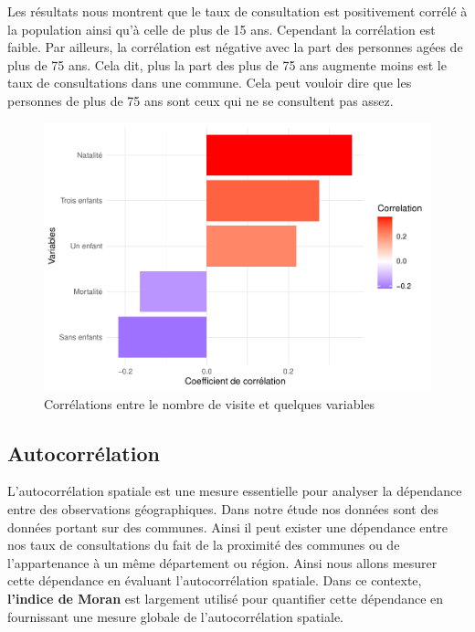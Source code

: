 Les résultats nous montrent que le taux de consultation est positivement
corrélé à la population ainsi qu'à celle de plus de 15 ans. Cependant la
corrélation est faible. Par ailleurs, la corrélation est négative avec
la part des personnes agées de plus de 75 ans. Cela dit, plus la part
des plus de 75 ans augmente moins est le taux de consultations dans une
commune. Cela peut vouloir dire que les personnes de plus de 75 ans sont
ceux qui ne se consultent pas assez.

\begin{figure}

{\centering \includegraphics{4_Analyse_Descriptive_files/figure-latex/unnamed-chunk-12-1} 

}

\caption{Corrélations entre le nombre de visite et quelques variables}\label{fig:unnamed-chunk-12}
\end{figure}

\subsection{Autocorrélation}\label{autocorruxe9lation}

L'autocorrélation spatiale est une mesure essentielle pour analyser la
dépendance entre des observations géographiques. Dans notre étude nos
données sont des données portant sur des communes. Ainsi il peut exister
une dépendance entre nos taux de consultations du fait de la proximité
des communes ou de l'appartenance à un même département ou région. Ainsi
nous allons mesurer cette dépendance en évaluant l'autocorrélation
spatiale. Dans ce contexte, \textbf{l'indice de Moran} est largement
utilisé pour quantifier cette dépendance en fournissant une mesure
globale de l'autocorrélation spatiale.

